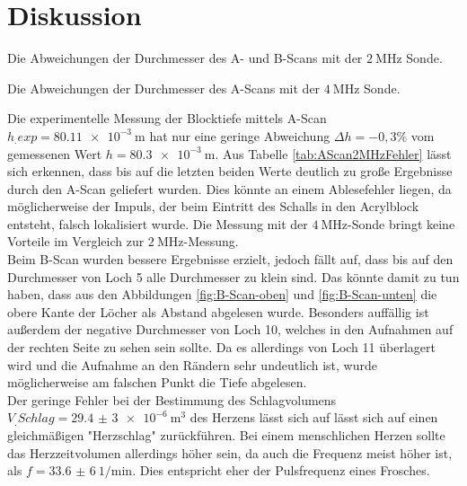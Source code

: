 
\section{Diskussion}
\label{sec:Diskussion}

\begin{table}
	\centering
	\caption{Die Abweichungen der Durchmesser des A- und B-Scans mit der $\SI{2}{\mega\hertz}$ Sonde.}
	
	\label{tab:AScan2MHzFehler}
\end{table}

\begin{table}
	\centering
	\caption{Die Abweichungen der Durchmesser des A-Scans mit der $\SI{4}{\mega\hertz}$ Sonde.}
	
	\label{tab:AScan4MHzFehler}
\end{table}

\noindent Die experimentelle Messung der Blocktiefe mittels A-Scan $h_.{exp}=\SI{80.11e-3}{\metre}$ hat nur eine geringe Abweichung $\Delta h = -0,3 \%$ vom gemessenen Wert $h=\SI{80.3e-3}{\metre}$.
Aus Tabelle \ref{tab:AScan2MHzFehler} lässt sich erkennen, dass bis auf die letzten beiden Werte deutlich zu große Ergebnisse durch den A-Scan geliefert wurden. Dies könnte an einem Ablesefehler liegen, da möglicherweise der Impuls, der beim Eintritt des Schalls in den Acrylblock entsteht, falsch lokalisiert wurde. 
Die Messung mit der $\SI{4}{\mega\hertz}$-Sonde bringt keine Vorteile im Vergleich zur
$\SI{2}{\mega\hertz}$-Messung.\\
Beim B-Scan wurden bessere Ergebnisse erzielt, jedoch fällt auf, dass bis auf den Durchmesser von Loch 5 alle Durchmesser zu klein sind. Das könnte damit zu tun haben, dass aus den Abbildungen \ref{fig:B-Scan-oben} und \ref{fig:B-Scan-unten} die obere Kante der Löcher als Abstand abgelesen wurde. Besonders auffällig ist außerdem der negative Durchmesser von Loch 10, welches in den Aufnahmen auf der rechten Seite zu sehen sein sollte. Da es allerdings von Loch 11 überlagert wird und die Aufnahme an den Rändern sehr undeutlich ist, wurde möglicherweise am falschen Punkt die Tiefe abgelesen.\\
Der geringe Fehler bei der Bestimmung des Schlagvolumens $V_.{Schlag}=\SI{29,4(3)e-6}{\cubic\metre}$ des Herzens lässt sich auf lässt sich auf einen gleichmäßigen "Herzschlag" zurückführen. Bei einem menschlichen Herzen sollte das Herzzeitvolumen allerdings höher sein, da auch die Frequenz meist höher ist, als $f=\SI{33,6(6)}{1\per\minute}$. Dies entspricht eher der Pulsfrequenz eines Frosches.
